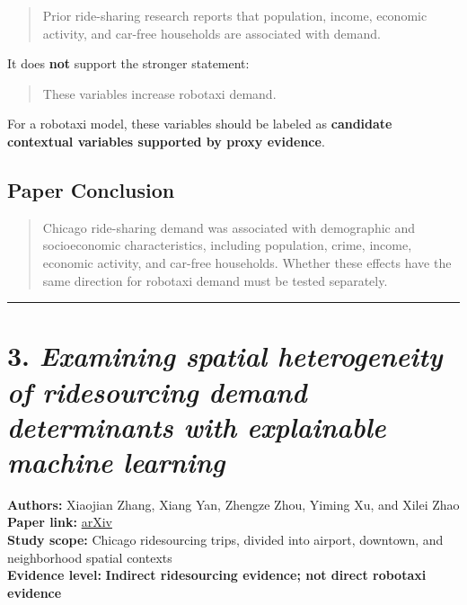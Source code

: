 \documentclass[10pt,a4paper]{article}
\begin{document}
\begin{quote}
Prior ride-sharing research reports that population, income, economic activity, and car-free households are associated with demand.
\end{quote}

It does \textbf{not} support the stronger statement:

\begin{quote}
These variables increase robotaxi demand.
\end{quote}

For a robotaxi model, these variables should be labeled as \textbf{candidate contextual variables supported by proxy evidence}.

\hypertarget{paper-conclusion-1}{%
\subsection{Paper Conclusion}\label{paper-conclusion-1}}

\begin{quote}
Chicago ride-sharing demand was associated with demographic and socioeconomic characteristics, including population, crime, income, economic activity, and car-free households. Whether these effects have the same direction for robotaxi demand must be tested separately.
\end{quote}

\begin{center}\rule{0.5\linewidth}{0.5pt}\end{center}

\hypertarget{examining-spatial-heterogeneity-of-ridesourcing-demand-determinants-with-explainable-machine-learning}{%
\section{\texorpdfstring{3. \emph{Examining spatial heterogeneity of ridesourcing demand determinants with explainable machine learning}}{3. Examining spatial heterogeneity of ridesourcing demand determinants with explainable machine learning}}\label{examining-spatial-heterogeneity-of-ridesourcing-demand-determinants-with-explainable-machine-learning}}

\textbf{Authors:} Xiaojian Zhang, Xiang Yan, Zhengze Zhou, Yiming Xu, and Xilei Zhao\\
\textbf{Paper link:} \href{https://arxiv.org/abs/2209.07980}{arXiv}\\
\textbf{Study scope:} Chicago ridesourcing trips, divided into airport, downtown, and neighborhood spatial contexts\\
\textbf{Evidence level:} \textbf{Indirect ridesourcing evidence; not direct robotaxi evidence}
\end{document}
